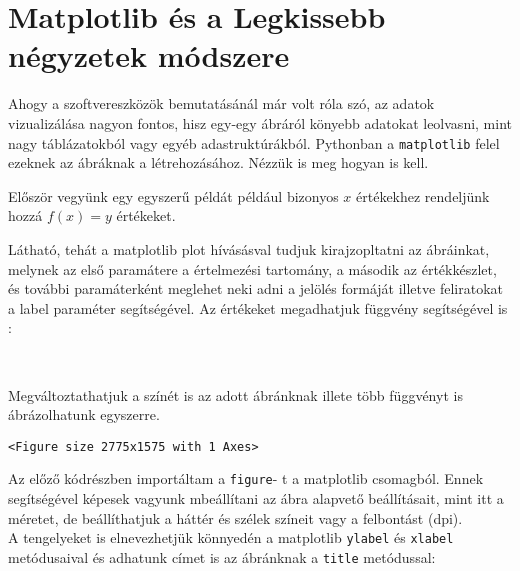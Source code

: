 \section{Matplotlib és a Legkissebb négyzetek
módszere}\label{matplotlib-uxe9s-a-legkissebb-nuxe9gyzetek-muxf3dszere}

    

    Ahogy a szoftvereszközök bemutatásánál már volt róla szó, az adatok
vizualizálása nagyon fontos, hisz egy-egy ábráról könyebb adatokat
leolvasni, mint nagy táblázatokból vagy egyéb adastruktúrákból.
Pythonban a \texttt{matplotlib} felel ezeknek az ábráknak a
létrehozásához. Nézzük is meg hogyan is kell.

    Először vegyünk egy egyszerű példát például bizonyos \(x\) értékekhez
rendeljünk hozzá \(f(x)=y\) értékeket.

\begin{python}

\end{python}

    Látható, tehát a matplotlib plot hívásásval tudjuk kirajzopltatni az
ábráinkat, melynek az első paramátere a értelmezési tartomány, a második
az értékkészlet, és további paramáterként meglehet neki adni a jelölés
formáját illetve feliratokat a label paraméter segítségével. Az
értékeket megadhatjuk függvény segítségével is :

\begin{python}

\end{python}

    \begin{center}
    \end{center}
    { \hspace*{\fill} \\}
    
    Megváltoztathatjuk a színét is az adott ábránknak illete több függvényt
is ábrázolhatunk egyszerre.

\begin{python}

\end{python}

    
    \begin{verbatim}
<Figure size 2775x1575 with 1 Axes>
    \end{verbatim}

    
    Az előző kódrészben importáltam a \texttt{figure}- t a matplotlib
csomagból. Ennek segítségével képesek vagyunk mbeállítani az ábra
alapvető beállításait, mint itt a méretet, de beállíthatjuk a háttér és
szélek színeit vagy a felbontást (dpi).\\
A tengelyeket is elnevezhetjük könnyedén a matplotlib \texttt{ylabel} és
\texttt{xlabel} metódusaival és adhatunk címet is az ábránknak a
\texttt{title} metódussal:

